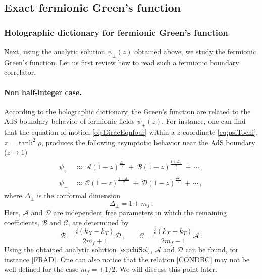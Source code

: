 \documentclass[11pt,a4paper]{article}
\begin{document}
%    
\subsection{Exact fermionic Green's function} \label{Exact fermionic Green's function}

\subsubsection{Holographic dictionary for fermionic Green's function}
Next, using the analytic solution $\psi_\pm(z)$ obtained above, we study the fermionic Green's function. Let us first review how to read such a fermionic boundary correlator.

\paragraph{Non half-integer case.}
According to the holographic dictionary, the Green's function are related to the AdS boundary behavior of fermionic fields $\psi_\pm(z)$.
For instance, one can find that the equation of motion \eqref{eq:DiracEqnfour} within a $z$-coordinate \eqref{eq:psiTochi}, $z=\tanh^2{\rho}$, produces the following asymptotic behavior near the AdS boundary ($z\rightarrow1$)
\begin{align}\label{eq:Non-Integer boundary behavior}
\begin{split}
    \psi_+ &\,\approx\, \mathcal{A} (1-z)^{\frac{\Delta_{-}}{2}} \,+\, \mathcal{B} (1-z)^{\frac{1+\Delta_{+}}{2}}  \,+\, \cdots  \,, \\
    \psi_- &\,\approx\, \mathcal{C} (1-z)^{\frac{1+\Delta_{-}}{2}} \,+\, \mathcal{D} (1-z)^{\frac{\Delta_{+}}{2}} \,+\, \cdots \,,
\end{split}
\end{align}
where $\Delta_{\pm}$ is the conformal dimension
\begin{equation}\label{SDR}
    \Delta_{\pm} = 1\pm m_f \,.
\end{equation}
Here, $\mathcal{A}$ and $\mathcal{D}$ are independent free parameters in which the remaining coefficients, $\mathcal{B}$ and $\mathcal{C}$, are determined by
\begin{equation}\label{CONDBC}
    \mathcal{B}=\frac{i(k_X-k_T)}{2m_f+1} \mathcal{D}\,, \qquad
    \mathcal{C}=\frac{i(k_X+k_T)}{2m_f-1} \mathcal{A}\,.
\end{equation}
Using the obtained analytic solution $\eqref{eq:chiSol}$, $\mathcal{A}$ and $\mathcal{D}$ can be found, for instance \eqref{FRAD}.
One can also notice that the relation \eqref{CONDBC} may not be well defined for the case $m_f=\pm1/2$. We will discuss this point later.
\end{document}

